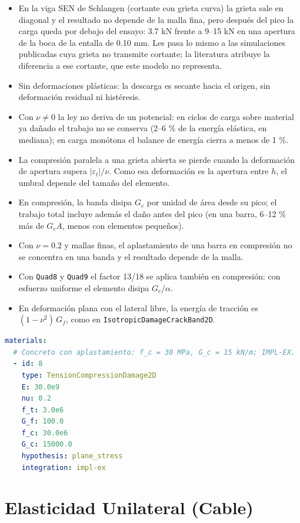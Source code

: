 \documentclass[11pt,oneside]{report}
\begin{document}
\begin{itemize}
  \item En la viga SEN de Schlangen (cortante con grieta curva) la grieta sale en diagonal y el resultado no depende de la malla fina, pero después del pico la carga queda por debajo del ensayo: 3.7 kN frente a 9--15 kN en una apertura de la boca de la entalla de 0.10 mm. Les pasa lo mismo a las simulaciones publicadas cuya grieta no transmite cortante; la literatura atribuye la diferencia a ese cortante, que este modelo no representa.
  \item Sin deformaciones plásticas: la descarga es secante hacia el origen, sin deformación residual ni histéresis.
  \item Con $\nu \ne 0$ la ley no deriva de un potencial: en ciclos de carga sobre material ya dañado el trabajo no se conserva (2--6 \% de la energía elástica, en mediana); en carga monótona el balance de energía cierra a menos de 1 \%.
  \item La compresión paralela a una grieta abierta se pierde cuando la deformación de apertura supera $|\varepsilon_t|/\nu$. Como esa deformación es la apertura entre $h$, el umbral depende del tamaño del elemento.
  \item En compresión, la banda disipa $G_c$ por unidad de área desde su pico; el trabajo total incluye además el daño antes del pico (en una barra, 6--12 \% más de $G_c A$, menos con elementos pequeños).
  \item Con $\nu = 0.2$ y mallas finas, el aplastamiento de una barra en compresión no se concentra en una banda y el resultado depende de la malla.
  \item Con \texttt{Quad8} y \texttt{Quad9} el factor 13/18 se aplica también en compresión: con esfuerzo uniforme el elemento disipa $G_c/\alpha$.
  \item En deformación plana con el lateral libre, la energía de tracción es $(1-\nu^2)\,G_f$, como en \texttt{IsotropicDamageCrackBand2D}.
\end{itemize}

\begin{lstlisting}[language=yaml]
materials:
  # Concreto con aplastamiento: f_c = 30 MPa, G_c = 15 kN/m; IMPL-EX.
  - id: 8
    type: TensionCompressionDamage2D
    E: 30.0e9
    nu: 0.2
    f_t: 3.0e6
    G_f: 100.0
    f_c: 30.0e6
    G_c: 15000.0
    hypothesis: plane_stress
    integration: impl-ex

\end{lstlisting}

\section{Elasticidad Unilateral (Cable)}
\end{document}
